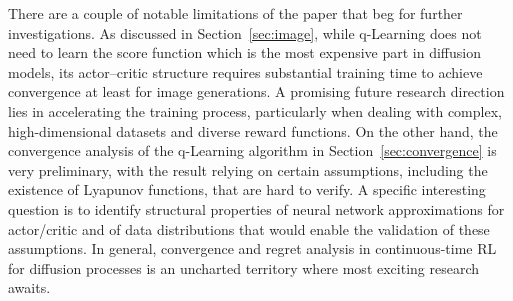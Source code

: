 \documentclass[11pt]{article}
\begin{document}
There are a couple of notable limitations of the paper that beg for further investigations.
As discussed in Section~\ref{sec:image}, while q-Learning does not need to learn the score function which is the most expensive part in diffusion models, its actor--critic structure requires substantial training time to achieve convergence at least for image generations. A promising future research direction lies in accelerating the training process, particularly when dealing with complex, high-dimensional datasets and diverse reward functions. On the other hand, the convergence analysis of the q-Learning algorithm in Section~\ref{sec:convergence} is very preliminary, with the result relying on certain assumptions, including the existence of Lyapunov functions, that are hard to verify. A specific interesting question is to identify  structural properties of neural network approximations for actor/critic  and of data distributions that would enable the validation of these assumptions.
In general, convergence and regret analysis in continuous-time RL for diffusion processes is an uncharted territory where most exciting research awaits.  






\newpage
 

\end{document}
